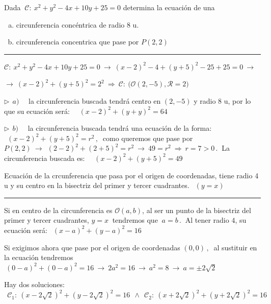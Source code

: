 \begin{miejercicio}

Dada $\ \mathcal C:\ x^2+y^2-4x+10y+25=0$ determina la ecuación de una

\begin{enumerate}[a) ]
\item 	circunferencia concéntrica de radio $8$ u.
\item   circunferencia concentrica que pase por $P(2,2)$
\end{enumerate}

\rule{250pt}{0.1pt}

\vspace{2mm} $\mathcal C:\ x^2+y^2-4x+10y+25=0 \ \to \ (x-2)^2-4+(y+5)^2-25+25=0 \ \to \ $

\vspace{2mm} $\to \ (x-2)^2+(y+5)^2=2^2 \ \Rightarrow \ \mathcal C:\ \Big( \mathcal O(2,-5), \mathcal R=2 \Big)$

\vspace{4mm} $\triangleright \ \ a) \quad 	$ la circunferencia buscada tendrá centro en $(2,-5)$ y radio $8$ u, por lo que su ecuación será:
$\quad (x-2)^2+(y+y)^2=64$

\vspace{4mm} $\triangleright \ \ b) \quad 	$ la circunferencia buscada tendrá una ecuación de la forma:  $\ \ (x-2)^2+(y+5)^2=r^2\, , \  $ como queremos que pase por $P(2,2) \ \to \ \ (2-2)^2+(2+5)^2=r^2 \ \to \ 49=r^2 \ \Rightarrow \ r=7>0\, . \ $ La circunferencia buscada es: $\quad (x-2)^2+(y+5)^2=49$
\end{miejercicio}


\begin{miejercicio}

Ecuación de la crcunferencia que pasa por el origen de coordenadas, tiene radio 4 u y su centro en la bisectriz del primer y tercer cuadrantes. \textcolor{gris}{$\ \ (y=x)$}

\rule{250pt}{0.1pt}

\vspace{2mm}	Si en centro de la circunferencia es $\mathcal O(a,b)$, al ser un punto de la bisectriz del primer y tercer cuadrantes, $y=x \ $ tendremos que $ \ a=b\, . \ $ Al tener radio $4$, su ecuación será: $\ \ (x-a)^2+(y-a)^2=16$

\vspace{2mm} Si exigimos ahora que pase por el origen de coordenadas $(0,0)\, , \  $ al sustituir en la ecuación tendremos $ \ (0-a)^2+(0-a)^2=16 \ \to \ 2a^2=16 \ \to \  a^2=8 \ \to \ a=\pm 2\sqrt{2}$

\vspace{2mm} Hay dos soluciones: $\ \ \mathcal C_1:\ (x-2\sqrt{2})^2+(y-2\sqrt{2})^2=16 \ \ \wedge \ \ \mathcal C_2:\ (x+2\sqrt{2})^2+(y+2\sqrt{2})^2=16 $
\end{miejercicio}



